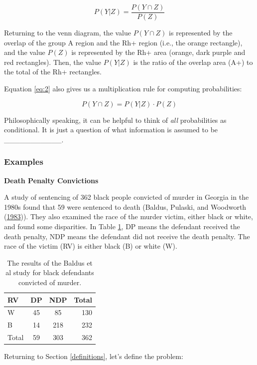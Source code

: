 \documentclass[]{book}
\theoremstyle{definition}
\theoremstyle{definition}
\theoremstyle{remark}
\begin{document}
\begin{equation}\label{eq:2}
P(Y|Z) = \frac{P(Y\cap Z)}{P(Z)}
\end{equation}

Returning to the venn diagram, the value \(P(Y \cap Z)\) is represented
by the overlap of the group A region and the Rh+ region (i.e., the
orange rectangle), and the value \(P(Z)\) is represented by the Rh+ area
(orange, dark purple and red rectangles). Then, the value \(P(Y|Z)\) is
the ratio of the overlap area (A+) to the total of the Rh+ rectangles.

Equation \ref{eq:2} also gives us a multiplication rule for computing
probabilities:

\begin{equation}\label{eq:3}
P(Y\cap Z) = P(Y|Z) \cdot P(Z)
\end{equation}

Philosophically speaking, it can be helpful to think of \emph{all}
probabilities as conditional. It is just a question of what information
is assumed to be \_\_\_\_\_\_\_\_\_\_\_.

\subsubsection{Examples}\label{examples-1}

\textbf{Death Penalty Convictions}

A study of sentencing of 362 black people convicted of murder in Georgia
in the 1980s found that 59 were sentenced to death (Baldus, Pulaski, and
Woodworth (\protect\hyperlink{ref-baldus}{1983})). They also examined
the race of the murder victim, either black or white, and found some
disparities. In Table \ref{tab:dp}, DP means the defendant received the
death penalty, NDP means the defendant did not receive the death
penalty. The race of the victim (RV) is either black (B) or white (W).

\begin{table}
\centering
\begin{tabular}{l|cc|r}
RV & DP & NDP & Total \\
\hline
W & 45 & 85 & 130 \\
B & 14 & 218 & 232 \\
\hline
Total & 59 & 303 & 362
\end{tabular}
\caption{\label{tab:dp}The results of the Baldus et al study for black defendants convicted of murder.}
\end{table}

Returning to Section \ref{definitions}, let's define the problem:
\end{document}
